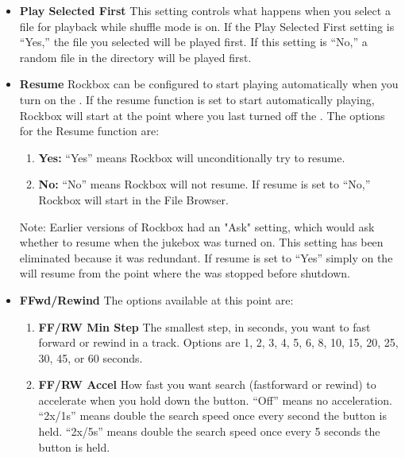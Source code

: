 \begin{itemize}
\begin{itemize}
  \item \textbf{Play Selected First}
    This setting controls what happens when you select a file for playback while shuffle mode is on. If the Play Selected First setting is ``Yes,'' the file you selected will be played first. If this setting is ``No,'' a random file in the directory will be played first.
  \item \textbf{Resume}
    Rockbox can be configured to start playing automatically when you turn on the \dap.  If the resume function is set to start automatically playing, Rockbox will start at the point where you last turned off the \dap.  The options for the Resume function are:
    \begin{enumerate}
    \item\textbf{Yes:  }``Yes'' means Rockbox will unconditionally try to resume. 
    \item\textbf{No:  }``No'' means Rockbox will not resume. If resume is set to ``No,'' Rockbox will start in the File Browser.
    \end{enumerate}
    Note:  Earlier versions of Rockbox had an "Ask" setting, which would ask whether to resume when the jukebox was turned on. This setting has been eliminated because it was redundant. If resume is set to ``Yes'' simply on the \dap will resume from the point where the \dap was stopped before shutdown.
    
  \item \textbf{FFwd/Rewind}
    The options available at this point are:
    \begin{enumerate}
    \item \textbf{FF/RW Min Step}
      The smallest step, in seconds, you want to fast forward or rewind in a track.  Options are 1, 2, 3, 4, 5, 6, 8, 10, 15, 20, 25, 30, 45, or 60 seconds.
    \item \textbf{FF/RW Accel}
      How fast you want search (fastforward or rewind) to accelerate when you hold down the button. ``Off'' means no acceleration. ``2x/1s'' means double the search speed once every second the button is held. ``2x/5s'' means double the search speed once every 5 seconds the button is held.
    \end{enumerate}
    

\end{itemize}
\end{itemize}
